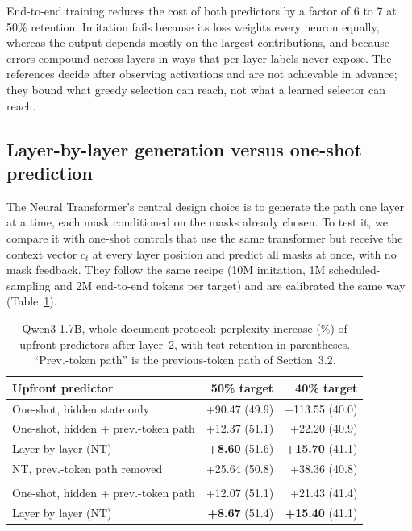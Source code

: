 \documentclass[10pt,twocolumn,letterpaper]{article}
\begin{document}
End-to-end training reduces the cost of both predictors by a factor of 6 to 7 at 50\% retention. Imitation fails because its loss weights every neuron equally, whereas the output depends mostly on the largest contributions, and because errors compound across layers in ways that per-layer labels never expose. The references decide after observing activations and are not achievable in advance; they bound what greedy selection can reach, not what a learned selector can reach.

\subsection{Layer-by-layer generation versus one-shot prediction}
\label{sec:oneshot}

The Neural Transformer's central design choice is to generate the path one layer at a time, each mask conditioned on the masks already chosen. To test it, we compare it with one-shot controls that use the same transformer but receive the context vector $c_t$ at every layer position and predict all masks at once, with no mask feedback. They follow the same recipe (10M imitation, 1M scheduled-sampling and 2M end-to-end tokens per target) and are calibrated the same way (Table~\ref{tab:oneshot}).

\begin{table}[t]
\centering
\caption{Qwen3-1.7B, whole-document protocol: perplexity increase (\%) of upfront predictors after layer~2, with test retention in parentheses. ``Prev.-token path'' is the previous-token path of Section~3.2.}
\label{tab:oneshot}
\small
\begin{tabular}{@{}lrr@{}}
\toprule
Upfront predictor & 50\% target & 40\% target \\
\midrule
One-shot, hidden state only & +90.47 {\footnotesize (49.9)} & +113.55 {\footnotesize (40.0)} \\
One-shot, hidden + prev.-token path & +12.37 {\footnotesize (51.1)} & +22.20 {\footnotesize (40.9)} \\
Layer by layer (NT) & \textbf{+8.60} {\footnotesize (51.6)} & \textbf{+15.70} {\footnotesize (41.1)} \\
NT, prev.-token path removed & +25.64 {\footnotesize (50.8)} & +38.36 {\footnotesize (40.8)} \\
\addlinespace
\multicolumn{3}{@{}l}{\emph{Second training seed}} \\
One-shot, hidden + prev.-token path & +12.07 {\footnotesize (51.1)} & +21.43 {\footnotesize (41.4)} \\
Layer by layer (NT) & \textbf{+8.67} {\footnotesize (51.4)} & \textbf{+15.40} {\footnotesize (41.1)} \\
\bottomrule
\end{tabular}
\end{table}
\end{document}
